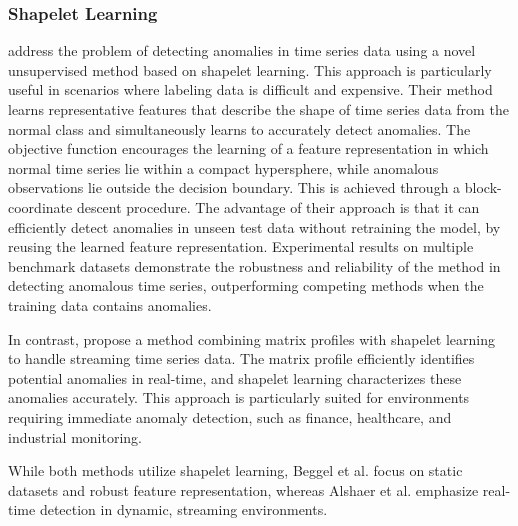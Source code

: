 \subsubsection{Shapelet Learning}
 address the problem of detecting anomalies in time series data using a novel unsupervised method based on shapelet learning. This approach is particularly useful in scenarios where labeling data is difficult and expensive.
Their method learns representative features that describe the shape of time series data from the normal class and simultaneously learns to accurately detect anomalies. The objective function encourages the learning of a feature representation in which normal time series lie within a compact hypersphere, while anomalous observations lie outside the decision boundary. This is achieved through a block-coordinate descent procedure.
The advantage of their approach is that it can efficiently detect anomalies in unseen test data without retraining the model, by reusing the learned feature representation. Experimental results on multiple benchmark datasets demonstrate the robustness and reliability of the method in detecting anomalous time series, outperforming competing methods when the training data contains anomalies.

In contrast,  propose a method combining matrix profiles with shapelet learning to handle streaming time series data. The matrix profile efficiently identifies potential anomalies in real-time, and shapelet learning characterizes these anomalies accurately. This approach is particularly suited for environments requiring immediate anomaly detection, such as finance, healthcare, and industrial monitoring.

While both methods utilize shapelet learning, Beggel et al. focus on static datasets and robust feature representation, whereas Alshaer et al. emphasize real-time detection in dynamic, streaming environments.



